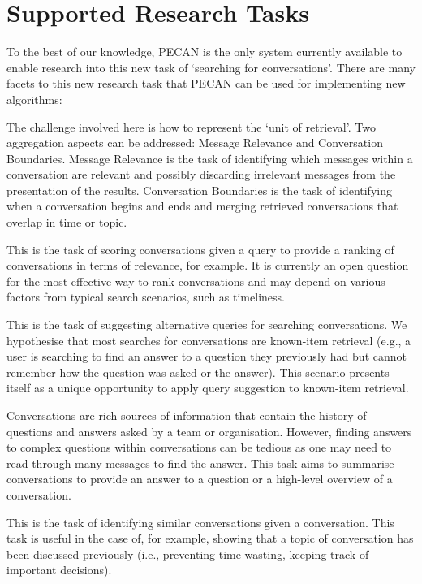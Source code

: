 \section{Supported Research Tasks}
\label{sec:importance}

To the best of our knowledge, PECAN is the only system currently available to enable research into this new task of `searching for conversations'. There are many facets to this new research task that PECAN can be used for implementing new algorithms:

\begin{description}[noitemsep,leftmargin=8pt]
\item[Conversation Aggregations:] The challenge involved here is how to represent the `unit of retrieval'. Two aggregation aspects can be addressed: Message Relevance and Conversation Boundaries. Message Relevance is the task of identifying which messages within a conversation are relevant and possibly discarding irrelevant messages from the presentation of the results. Conversation Boundaries is the task of identifying when a conversation begins and ends and merging retrieved conversations that overlap in time or topic.
\item[Conversation Scoring:] This is the task of scoring conversations given a query to provide a ranking of conversations in terms of relevance, for example. It is currently an open question for the most effective way to rank conversations and may depend on various factors from typical search scenarios, such as timeliness.
\item[Query Suggestion:] This is the task of suggesting alternative queries for searching conversations. We hypothesise that most searches for conversations are known-item retrieval (e.g., a user is searching to find an answer to a question they previously had but cannot remember how the question was asked or the answer). This scenario presents itself as a unique opportunity to apply query suggestion to known-item retrieval.
\item[Conversation Summarisation:] Conversations are rich sources of information that contain the history of questions and answers asked by a team or organisation. However, finding answers to complex questions within conversations can be tedious as one may need to read through many messages to find the answer. This task aims to summarise conversations to provide an answer to a question or a high-level overview of a conversation.
\item[Related Conversations:] This is the task of identifying similar conversations given a conversation. This task is useful in the case of, for example, showing that a topic of conversation has been discussed previously (i.e., preventing time-wasting, keeping track of important decisions).
\end{description}
 
 